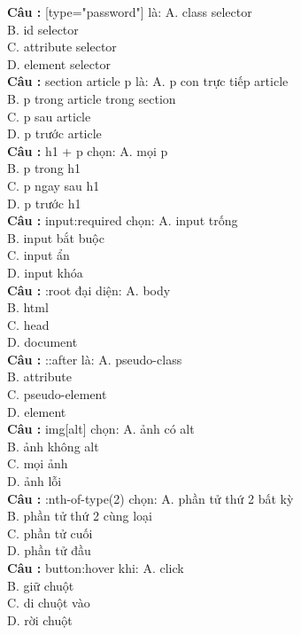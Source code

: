 \documentclass[12pt,a4paper]{article}
\begin{document}
\textbf{Câu :} [type="password"] là:
A. class selector \\
B. id selector \\
C. attribute selector \\
D. element selector \\

\textbf{Câu :} section article p là:
A. p con trực tiếp article \\
B. p trong article trong section \\
C. p sau article \\
D. p trước article \\

\textbf{Câu :} h1 + p chọn:
A. mọi p \\
B. p trong h1 \\
C. p ngay sau h1 \\
D. p trước h1 \\

\textbf{Câu :} input:required chọn:
A. input trống \\
B. input bắt buộc \\
C. input ẩn \\
D. input khóa \\

\textbf{Câu :} :root đại diện:
A. body \\
B. html \\
C. head \\
D. document \\

\textbf{Câu :} ::after là:
A. pseudo-class \\
B. attribute \\
C. pseudo-element \\
D. element \\

\textbf{Câu :} img[alt] chọn:
A. ảnh có alt \\
B. ảnh không alt \\
C. mọi ảnh \\
D. ảnh lỗi \\

\textbf{Câu :} :nth-of-type(2) chọn:
A. phần tử thứ 2 bất kỳ \\
B. phần tử thứ 2 cùng loại \\
C. phần tử cuối \\
D. phần tử đầu \\

\textbf{Câu :} button:hover khi:
A. click \\
B. giữ chuột \\
C. di chuột vào \\
D. rời chuột \\
\end{document}

